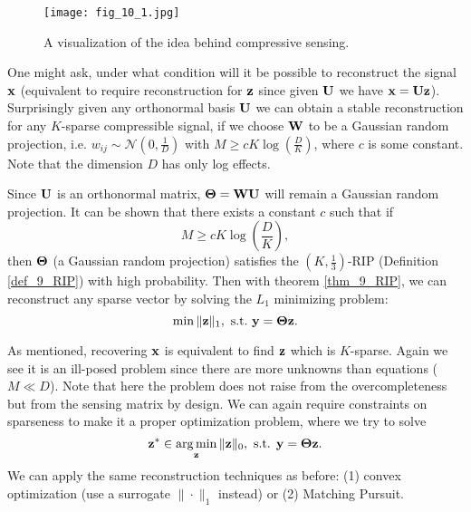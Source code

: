 \documentclass[../book-template.tex]{subfiles}
\begin{document}
\begin{figure}[h] 
	\centering 
	\texttt{[image: fig\_10\_1.jpg]} 
	\caption{A visualization of the idea behind compressive sensing.}\label{fig_10_1}
\end{figure}
\par One might ask, under what condition will it be possible to reconstruct the signal ${\bf x}$ (equivalent to require reconstruction for ${\bf z}$ since given ${\bf U}$ we have ${\bf x}={\bf Uz}$). Surprisingly given any orthonormal basis ${\bf U}$ we can obtain a stable reconstruction for any $K$-sparse compressible signal, if we choose ${\bf W}$ to be a Gaussian random projection, i.e. $w_{ij}\sim \mathcal{N}(0,\frac{1}{D})$ with $M\geq cK\log(\frac{D}{K})$, where $c$ is some constant. Note that the dimension $D$ has only log effects.
\begin{remark}
	Since ${\bf U}$ is an orthonormal matrix, ${\bf \Theta}={\bf WU}$ will remain a Gaussian random projection. It can be shown that there exists a constant $c$ such that if
	\begin{equation*}
		M\geq cK\log(\frac{D}{K}),
	\end{equation*}
	then ${\bf \Theta}$ (a Gaussian random projection) satisfies the $(K,\frac{1}{3})$-RIP (Definition \ref{def_9_RIP}) with high probability. Then with theorem \ref{thm_9_RIP}, we can reconstruct any sparse vector by solving the $L_1$ minimizing problem:
	\begin{equation*}
		\min \|{\bf z}\|_1,\ {\rm s.t.}\ {\bf y}={\bf \Theta z}.
	\end{equation*}
\end{remark}
As mentioned, recovering ${\bf x}$ is equivalent to find ${\bf z}$ which is $K$-sparse. Again we see it is an ill-posed problem since there are more unknowns than equations ($M\ll D$). Note that here the problem does not raise from the overcompleteness but from the sensing matrix by design. We can again require constraints on sparseness to make it a proper optimization problem, where we try to solve
\begin{equation*}
	{\bf z}^*\in \mathop{\arg\min}_{\bf z}\|{\bf z}\|_0,\ \text{s.t. }{\bf y}={\bf \Theta z}.
\end{equation*} 
We can apply the same reconstruction techniques as before: (1) convex optimization (use a surrogate $\|\cdot\|_1$ instead) or (2) Matching Pursuit.
\end{document}
